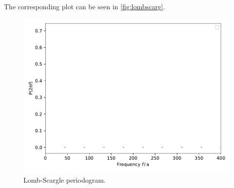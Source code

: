 The corresponding plot can be seen in \autoref{fig:lombscarg}.

\begin{figure}[H]
    \centering
    \includegraphics{plots/lomb_scarg.pdf}
    \caption{Lomb-Scargle periodogram.}
    \label{fig:lombscarg}
\end{figure}

